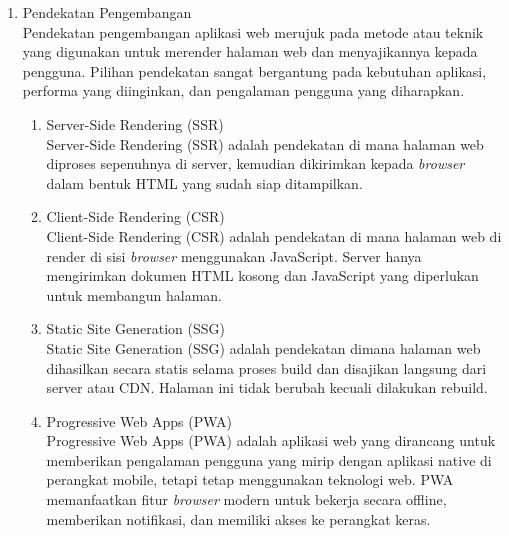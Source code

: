 \begin{enumerate}[label*=\arabic*.,ref=\arabic*]
    \item Pendekatan Pengembangan\\
        Pendekatan pengembangan aplikasi web merujuk pada metode atau teknik yang digunakan untuk merender halaman web dan menyajikannya kepada pengguna. Pilihan pendekatan sangat bergantung pada kebutuhan aplikasi, performa yang diinginkan, dan pengalaman pengguna yang diharapkan.
        \begin{enumerate}[label=\alph*.]
            \item Server-Side Rendering (SSR)\\
                Server-Side Rendering (SSR) adalah pendekatan di mana halaman web diproses sepenuhnya di server, kemudian dikirimkan kepada \textit{browser} dalam bentuk HTML yang sudah siap ditampilkan.
                
            \item Client-Side Rendering (CSR)\\
                Client-Side Rendering (CSR) adalah pendekatan di mana halaman web di render di sisi \textit{browser} menggunakan JavaScript. Server hanya mengirimkan dokumen HTML kosong dan JavaScript yang diperlukan untuk membangun halaman.
            
            \item Static Site Generation (SSG)\\
                Static Site Generation (SSG) adalah pendekatan dimana halaman web dihasilkan secara statis selama proses build dan disajikan langsung dari server atau CDN. Halaman ini tidak berubah kecuali dilakukan rebuild.
                
            \item Progressive Web Apps (PWA)\\
                Progressive Web Apps (PWA) adalah aplikasi web yang dirancang untuk memberikan pengalaman pengguna yang mirip dengan aplikasi native di perangkat mobile, tetapi tetap menggunakan teknologi web. PWA memanfaatkan fitur \textit{browser} modern untuk bekerja secara offline, memberikan notifikasi, dan memiliki akses ke perangkat keras.
                
        \end{enumerate}
\end{enumerate}